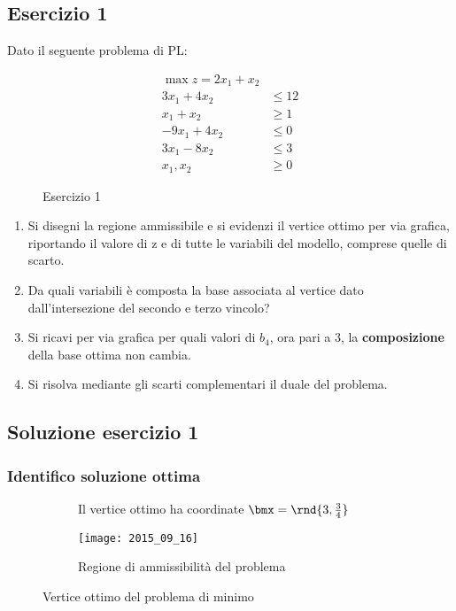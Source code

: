 \documentclass[\main/main.tex]{subfiles}
\begin{document}
\subsection{Esercizio 1}
Dato il seguente problema di PL:

\begin{figure}
  \begin{align*}
    \max z = 2x_1 + x_2    \\
    3x_1 + 4x_2  & \leq 12 \\
    x_1 + x_2    & \geq 1  \\
    -9x_1 + 4x_2 & \leq 0  \\
    3x_1 - 8x_2  & \leq 3  \\
    x_1, x_2     & \geq 0
  \end{align*}
  \caption{Esercizio 1}
\end{figure}

\begin{enumerate}
  \item Si disegni la regione ammissibile e si evidenzi il vertice ottimo per via grafica, riportando il valore di z e di tutte le variabili del modello, comprese quelle di scarto.
  \item Da quali variabili è composta la base associata al vertice dato dall'intersezione del secondo e terzo vincolo?
  \item Si ricavi per via grafica per quali valori di $b_4$, ora pari a $3$, la \textbf{composizione} della base ottima non cambia.
  \item Si risolva mediante gli scarti complementari il duale del problema.
\end{enumerate}

\subsection{Soluzione esercizio 1}

\subsubsection*{Identifico soluzione ottima}

\begin{figure}
  \begin{subfigure}{0.49\textwidth}
    \caption{Il vertice ottimo ha coordinate $\bmx = \rnd{3,\frac{3}{4}}$}
  \end{subfigure}
  \begin{subfigure}{0.49\textwidth}
    \texttt{[image: 2015\_09\_16]}
    \caption{Regione di ammissibilità del problema}
  \end{subfigure}
  \caption{Vertice ottimo del problema di minimo}
\end{figure}
\end{document}
